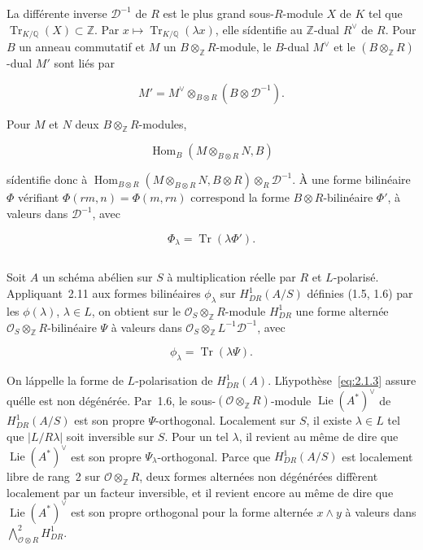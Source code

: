 \documentclass[11pt,a4paper]{article}
\theoremstyle{plain}
\theoremstyle{definition}
\DeclareMathOperator{\Hom}{Hom}
\DeclareMathOperator{\Lie}{Lie}
\DeclareMathOperator{\Tr}{Tr}
\begin{document}
La diff\'erente inverse $\mathscr{D}^{-1}$ de $R$ est le plus grand sous-$R$-module $X$ de $K$
tel que $\Tr_{K/\mathbb{Q}}(X) \subset \mathbb{Z}$. Par $x \mapsto \Tr_{K/\mathbb{Q}}(\lambda x)$, elle s\'identifie au $\mathbb{Z}$-dual $R^\vee$ de $R$.
Pour $B$ un anneau commutatif et $M$ un $B \otimes_{\mathbb{Z}} R$-module, le $B$-dual $M^\vee$ et le
$(B \otimes_{\mathbb{Z}} R)$-dual $M'$ sont li\'es par

\begin{equation}
M' = M^\vee \otimes_{B \otimes R} (B \otimes \mathscr{D}^{-1}).
\end{equation}

Pour $M$ et $N$ deux $B \otimes_{\mathbb{Z}} R$-modules,

\begin{equation}
\Hom_B(M \otimes_{B \otimes R} N, B)
\end{equation}

s\'identifie donc \`a $\Hom_{B \otimes R}(M \otimes_{B \otimes R} N, B \otimes R) \otimes_R \mathscr{D}^{-1}$. \`A une forme bilin\'eaire
$\Phi$ v\'erifiant $\Phi(rm, n) = \Phi(m, rn)$ correspond la forme $B \otimes R$-bilin\'eaire $\Phi'$, \`a
valeurs dans $\mathscr{D}^{-1}$, avec

\begin{equation}
\Phi_\lambda = \Tr(\lambda \Phi').
\end{equation}

\subsection{}

Soit $A$ un sch\'ema ab\'elien sur $S$ \`a multiplication r\'eelle par $R$ et $L$-polaris\'e.
Appliquant~2.11 aux formes bilin\'eaires $\phi_\lambda$ sur $H^1_{DR}(A/S)$ d\'efinies (1.5, 1.6) par
les $\phi(\lambda)$, $\lambda \in L$, on obtient sur le $\mathscr{O}_S \otimes_{\mathbb{Z}} R$-module $H^1_{DR}$ une forme altern\'ee
$\mathscr{O}_S \otimes_{\mathbb{Z}} R$-bilin\'eaire $\Psi$ \`a valeurs dans $\mathscr{O}_S \otimes_{\mathbb{Z}} L^{-1}\mathscr{D}^{-1}$, avec

\begin{equation}
\phi_\lambda = \Tr(\lambda \Psi).
\end{equation}

On l\'appelle la forme de $L$-polarisation de $H^1_{DR}(A)$. L\'hypoth\`ese~\eqref{eq:2.1.3}
assure qu\'elle est non d\'eg\'en\'er\'ee. Par~1.6, le sous-$(\mathscr{O} \otimes_{\mathbb{Z}} R)$-module $\Lie(A^*)^\vee$ de
$H^1_{DR}(A/S)$ est son propre $\Psi$-orthogonal. Localement sur $S$, il existe $\lambda \in L$ tel que
$|L/R\lambda|$ soit inversible sur $S$. Pour un tel $\lambda$, il revient au m\^eme de dire que
$\Lie(A^*)^\vee$ est son propre $\Psi_\lambda$-orthogonal. Parce que $H^1_{DR}(A/S)$ est localement
libre de rang~2 sur $\mathscr{O} \otimes_{\mathbb{Z}} R$, deux formes altern\'ees non d\'eg\'en\'er\'ees diff\`erent
localement par un facteur inversible, et il revient encore au m\^eme de dire que
$\Lie(A^*)^\vee$ est son propre orthogonal pour la forme altern\'ee $x \wedge y$ \`a valeurs
dans $\bigwedge^2_{\mathscr{O} \otimes R} H^1_{DR}$.
\end{document}
